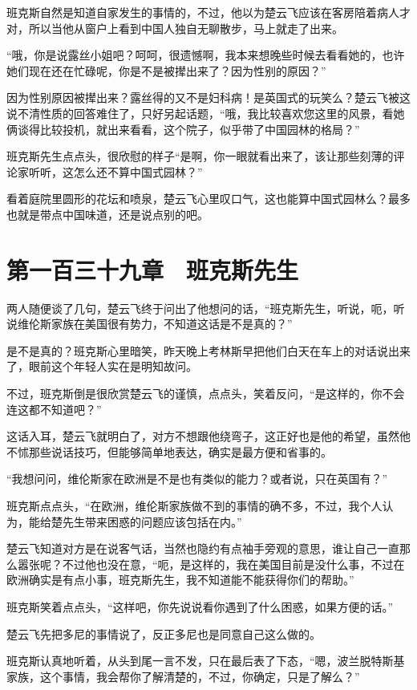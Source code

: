 班克斯自然是知道自家发生的事情的，不过，他以为楚云飞应该在客房陪着病人才对，所以当他从窗户上看到中国人独自无聊散步，马上就走了出来。

“哦，你是说露丝小姐吧？呵呵，很遗憾啊，我本来想晚些时候去看看她的，也许她们现在还在忙碌呢，你是不是被撵出来了？因为性别的原因？”

因为性别原因被撵出来？露丝得的又不是妇科病！是英国式的玩笑么？楚云飞被这说不清性质的回答难住了，只好另起话题，“哦，我比较喜欢您这里的风景，看她俩谈得比较投机，就出来看看，这个院子，似乎带了中国园林的格局？”

班克斯先生点点头，很欣慰的样子“是啊，你一眼就看出来了，该让那些刻薄的评论家听听，这怎么还不算中国式园林？”

看着庭院里圆形的花坛和喷泉，楚云飞心里叹口气，这也能算中国式园林么？最多也就是带点中国味道，还是说点别的吧。

\section{第一百三十九章　班克斯先生}

两人随便谈了几句，楚云飞终于问出了他想问的话，“班克斯先生，听说，呃，听说维伦斯家族在美国很有势力，不知道这话是不是真的？”

是不是真的？班克斯心里暗笑，昨天晚上考林斯早把他们白天在车上的对话说出来了，眼前这个年轻人实在是明知故问。

不过，班克斯倒是很欣赏楚云飞的谨慎，点点头，笑着反问，“是这样的，你不会连这都不知道吧？”

这话入耳，楚云飞就明白了，对方不想跟他绕弯子，这正好也是他的希望，虽然他不怵那些说话技巧，但能够简单地表达，确实是最方便和省事的。

“我想问问，维伦斯家在欧洲是不是也有类似的能力？或者说，只在英国有？”

班克斯点点头，“在欧洲，维伦斯家族做不到的事情的确不多，不过，我个人认为，能给楚先生带来困惑的问题应该包括在内。”

楚云飞知道对方是在说客气话，当然也隐约有点袖手旁观的意思，谁让自己一直那么嚣张呢？不过他也没在意，“呃，是这样的，我在美国目前是没什么事，不过在欧洲确实是有点小事，班克斯先生，我不知道能不能获得你们的帮助。”

班克斯笑着点点头，“这样吧，你先说说看你遇到了什么困惑，如果方便的话。”

楚云飞先把多尼的事情说了，反正多尼也是同意自己这么做的。

班克斯认真地听着，从头到尾一言不发，只在最后表了下态，“嗯，波兰脱特斯基家族，这个事情，我会帮你了解清楚的，不过，你确定，只是了解么？”

